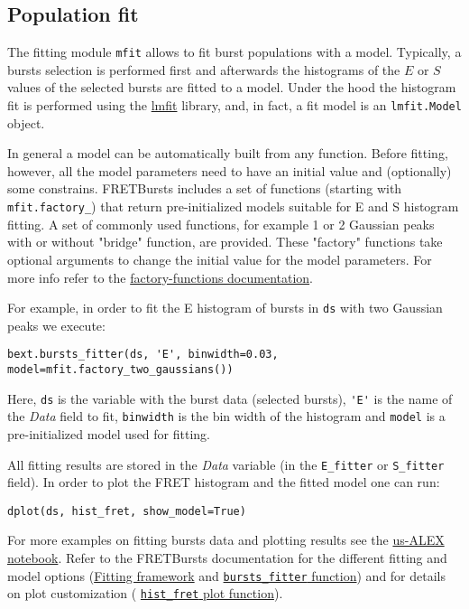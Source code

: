 \subsection{Population fit}
\label{sec:fretfit}

The fitting module \verb|mfit| allows to fit burst populations with a model.
Typically, a bursts selection is performed first and afterwards the histograms of
the $E$ or $S$ values of the selected bursts are fitted to a model. Under the
hood the histogram fit is performed using the
\href{http://lmfit.github.io/lmfit-py/}{lmfit} library, and, in fact, 
a fit model is an \verb|lmfit.Model| object.

In general a model can be automatically built from any function. Before fitting,
however, all the model parameters need to have an initial value and (optionally)
some constrains. FRETBursts includes a set of functions (starting with
\verb|mfit.factory_|) that return pre-initialized models suitable for E and S
histogram fitting. A set of commonly used functions, for example 1 or 2 Gaussian
peaks with or without "bridge" function, are provided. These "factory" functions
take optional arguments to change the initial value for the model parameters.
For more info refer to the
\href{http://fretbursts.readthedocs.org/en/latest/mfit.html#model-factory-functions}{factory-functions documentation}.

For example, in order to fit the E histogram of bursts in \verb|ds| with two
Gaussian peaks we execute:

\begin{verbatim}
bext.bursts_fitter(ds, 'E', binwidth=0.03, model=mfit.factory_two_gaussians())
\end{verbatim}

Here, \verb|ds| is the variable with the burst data (selected bursts),
\verb|'E'| is the name of the \textit{Data} field to fit, \verb|binwidth| is the bin
width of the histogram and \verb|model| is a pre-initialized model used for
fitting.

All fitting results are stored in the \textit{Data} variable (in the \verb|E_fitter| or
\verb|S_fitter| field).
In order to plot the FRET histogram and the fitted model one can run:

\begin{verbatim}
dplot(ds, hist_fret, show_model=True)
\end{verbatim}

For more examples on fitting bursts data and plotting results see the
\href{http://nbviewer.ipython.org/urls/raw.github.com/tritemio/FRETBursts_notebooks/master/notebooks/FRETBursts\%2520-\%2520us-ALEX\%2520smFRET\%2520burst\%2520analysis.ipynb}{us-ALEX notebook}.
Refer to the FRETBursts documentation for the different fitting and model options
(\href{http://fretbursts.readthedocs.org/en/latest/fit.html}{Fitting framework} and 
\href{http://fretbursts.readthedocs.org/en/latest/plugins.html#fretbursts.burstlib\_ext.bursts\_fitter}{\texttt{bursts\_fitter} function})
and for details on plot customization (
\href{http://fretbursts.readthedocs.org/en/latest/plots.html#fretbursts.burst_plot.hist_fret}{\texttt{hist\_fret} plot function}).

